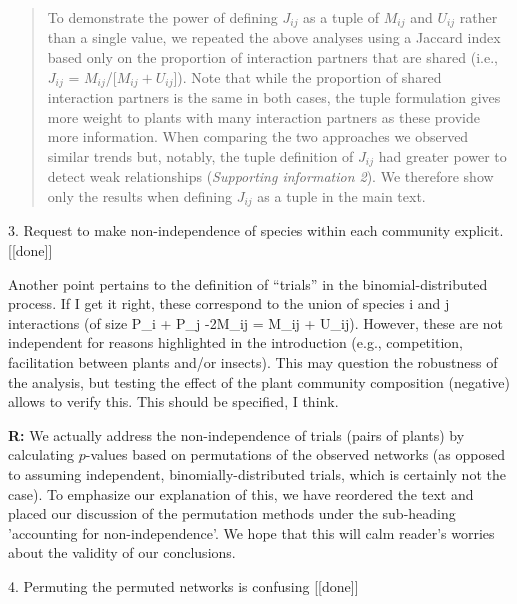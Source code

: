 \documentclass[12pt]{letter}
\newenvironment{refquote}{\bigskip \begin{it}}{\end{it}\smallskip}
\begin{document}
			\begin{quotation}

				To demonstrate the power of defining $J_{ij}$ as a tuple of $M_{ij}$ and $U_{ij}$ rather than a single value, we repeated the above analyses using a Jaccard index based only on the proportion of interaction partners that are shared (i.e., $J_{ij}$ = $M_{ij}$/[$M_{ij}+U_{ij}$]). Note that while the proportion of shared interaction partners is the same in both cases, the tuple formulation gives more weight to plants with many interaction partners as these provide more information. When comparing the two approaches 
				we observed similar trends but, notably, the tuple definition of $J_{ij}$ had greater power to detect weak relationships (\emph{Supporting information 2}). We therefore show only the results when defining $J_{ij}$ as a tuple in the main text.

			\end{quotation}


	3. Request to make non-independence of species within each community explicit. [[done]]

		\begin{refquote}
			Another point pertains to the definition of “trials” in the binomial-distributed process. If I get it right, these correspond to the union of species i and j interactions (of size P\_i + P\_j -2M\_ij = M\_ij + U\_ij). However, these are not independent for reasons highlighted in the introduction (e.g., competition, facilitation between plants and/or insects). This may question the robustness of the analysis, but testing the effect of the plant community composition (negative) allows to verify this. This should be specified, I think.
		\end{refquote}


		\textbf{R:} We actually address the non-independence of trials (pairs of plants) by calculating $p$-values based on permutations of the observed networks (as opposed to assuming independent, binomially-distributed trials, which is certainly not the case). To emphasize our explanation of this, we have reordered the text and placed our discussion of the permutation methods under the sub-heading 'accounting for non-independence'. We hope that this will calm reader's worries about the validity of our conclusions.


	4. Permuting the permuted networks is confusing [[done]]
\end{document}
